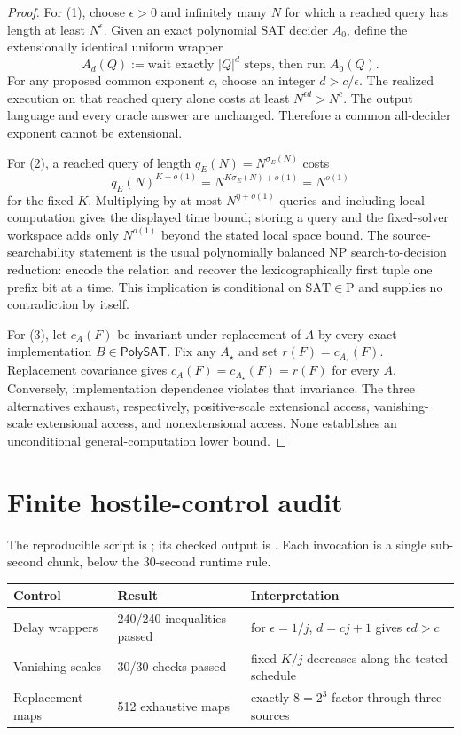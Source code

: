 \documentclass[11pt]{article}
\newcommand{\SAT}{\mathrm{SAT}}
\begin{document}
\begin{proof}
For (1), choose $\epsilon>0$ and infinitely many $N$ for which a reached
query has length at least $N^\epsilon$.  Given an exact polynomial SAT
decider $A_0$, define the extensionally identical uniform wrapper
\[
       A_d(Q):=\text{wait exactly }|Q|^d\text{ steps, then run }A_0(Q).
\]
For any proposed common exponent $c$, choose an integer $d>c/\epsilon$.
The realized execution on that reached query alone costs at least
$N^{\epsilon d}>N^c$.  The output language and every oracle answer are
unchanged.  Therefore a common all-decider exponent cannot be extensional.

For (2), a reached query of length $q_E(N)=N^{\sigma_E(N)}$ costs
\[
 q_E(N)^{K+o(1)}=N^{K\sigma_E(N)+o(1)}=N^{o(1)}
\]
for the fixed $K$.  Multiplying by at most $N^{\eta+o(1)}$ queries and
including local computation gives the displayed time bound; storing a query
and the fixed-solver workspace adds only $N^{o(1)}$ beyond the stated local
space bound.  The source-searchability statement is the usual polynomially
balanced NP search-to-decision reduction: encode the relation and recover
the lexicographically first tuple one prefix bit at a time.  This implication
is conditional on $\SAT\in\mathrm P$ and supplies no contradiction by itself.

For (3), let $c_A(F)$ be invariant under replacement of $A$ by every exact
implementation $B\in\mathsf{PolySAT}$.  Fix any $A_\star$ and set
$r(F)=c_{A_\star}(F)$.  Replacement covariance gives
$c_A(F)=c_{A_\star}(F)=r(F)$ for every $A$.  Conversely, implementation
dependence violates that invariance.  The three alternatives exhaust,
respectively, positive-scale extensional access, vanishing-scale extensional
access, and nonextensional access.  None establishes an unconditional
general-computation lower bound.
\end{proof}

\section{Finite hostile-control audit}

The reproducible script is
; its checked
output is
.
Each invocation is a single sub-second chunk, below the 30-second runtime
rule.
\begin{center}
\begin{tabular}{@{}lll@{}}
\toprule
Control & Result & Interpretation\\
\midrule
Delay wrappers & 240/240 inequalities passed &
for $\epsilon=1/j$, $d=cj+1$ gives $\epsilon d>c$\\
Vanishing scales & 30/30 checks passed &
fixed $K/j$ decreases along the tested schedule\\
Replacement maps & 512 exhaustive maps &
exactly $8=2^3$ factor through three sources\\
\bottomrule
\end{tabular}
\end{center}
\end{document}
